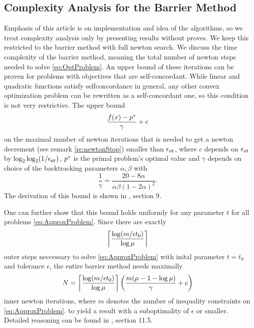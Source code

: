\subsection{Complexity Analysis for the Barrier Method}
Emphasis of this article is on implementation and idea of the algorithms, so we treat complexity analysis only by presenting results without proves. We keep this restricted to the barrier method with full newton search.  We discuss the time complexity of the barrier method, meaning the total number of newton steps needed to solve \eqref{eq:OptProblem}. 
An upper bound of these iterations can be proven for problems with objectives that are self-concordant. While linear and quadratic functions satisfy selfconcordance in general, any other convex optimization problem can be rewritten as a self-concordant one, so this condition is not very restrictive.
The upper bound
\begin{equation} %
	\frac{\fx - \popt}{\gamma} + c
\end{equation}
on the maximal number of newton iterations that is needed to get a newton decrement (see remark \ref{re:newtonStop}) smaller than $ \epsnt $, where $ c $ depends on $  \epsnt $ by $ \log_2 \log_2(1/\epsnt) $, $ \popt $ is the primal problem's  optimal value and $ \gamma $ depends on choice of the backtracking parameters $ \alpha, \beta $ with\[ \frac{1}{\gamma} = \frac{20-8\alpha}{\alpha \beta (1-2\alpha)^2}.\]
The derivation of this bound is shown in \cite{BV}, section 9.

One can further show that this bound holds uniformly for any parameter $ t $ for all problems \eqref{eq:ApproxProblem}.
 Since there are exactly \[ \ceil*{ \frac{\log(m/\epsilon t_0)}{\log \mu}} \] outer steps neccessary to solve  \eqref{eq:ApproxProblem} with inital parameter $ t=t_0  $ and tolerance $ \epsilon $, the entire barrier method needs maximally
 \[ N = \ceil*{\frac{\log(m/\epsilon t_0)}{\log \mu}}\left( \frac{m(\mu - 1 -\log \mu)}{\gamma} + c\right)  \]   inner newton iterations, where $ m $ denotes the number of inequality constraints on  \eqref{eq:ApproxProblem}. to yield a result with a suboptimality of $ \epsilon $ or smaller. Detailed reasoning can be found in \cite{BV}, section 11.5. 






